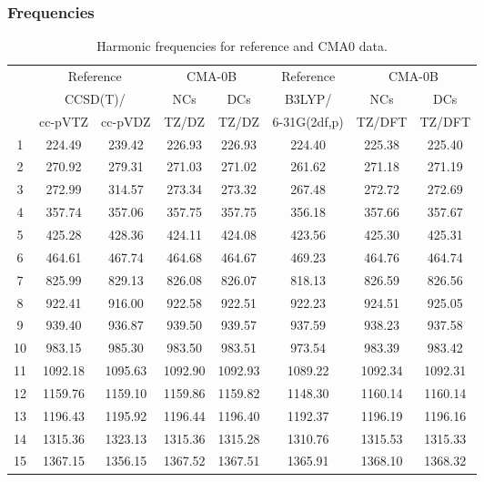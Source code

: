 \documentclass[10pt,oneside]{article}
\begin{document}
\clearpage

\subsubsection*{Frequencies}
\begin{table}[h!]
\centering
\caption{Harmonic frequencies for reference and CMA0 data.}
\begin{tabular}{cccccccc}
\toprule
{} & \multicolumn{2}{c}{Reference} & \multicolumn{2}{c}{CMA-0B} &    Reference & \multicolumn{2}{c}{CMA-0B} \\
{} & \multicolumn{2}{c}{CCSD(T)/} &     NCs &     DCs &       B3LYP/ &     NCs &     DCs \\
{} &   cc-pVTZ & cc-pVDZ &   TZ/DZ &   TZ/DZ & 6-31G(2df,p) &  TZ/DFT &  TZ/DFT \\
\midrule
1  &    224.49 &  239.42 &  226.93 &  226.93 &       224.40 &  225.38 &  225.40 \\
2  &    270.92 &  279.31 &  271.03 &  271.02 &       261.62 &  271.18 &  271.19 \\
3  &    272.99 &  314.57 &  273.34 &  273.32 &       267.48 &  272.72 &  272.69 \\
4  &    357.74 &  357.06 &  357.75 &  357.75 &       356.18 &  357.66 &  357.67 \\
5  &    425.28 &  428.36 &  424.11 &  424.08 &       423.56 &  425.30 &  425.31 \\
6  &    464.61 &  467.74 &  464.68 &  464.67 &       469.23 &  464.76 &  464.74 \\
7  &    825.99 &  829.13 &  826.08 &  826.07 &       818.13 &  826.59 &  826.56 \\
8  &    922.41 &  916.00 &  922.58 &  922.51 &       922.23 &  924.51 &  925.05 \\
9  &    939.40 &  936.87 &  939.50 &  939.57 &       937.59 &  938.23 &  937.58 \\
10 &    983.15 &  985.30 &  983.50 &  983.51 &       973.54 &  983.39 &  983.42 \\
11 &   1092.18 & 1095.63 & 1092.90 & 1092.93 &      1089.22 & 1092.34 & 1092.31 \\
12 &   1159.76 & 1159.10 & 1159.86 & 1159.82 &      1148.30 & 1160.14 & 1160.14 \\
13 &   1196.43 & 1195.92 & 1196.44 & 1196.40 &      1192.37 & 1196.19 & 1196.16 \\
14 &   1315.36 & 1323.13 & 1315.36 & 1315.28 &      1310.76 & 1315.53 & 1315.33 \\
15 &   1367.15 & 1356.15 & 1367.52 & 1367.51 &      1365.91 & 1368.10 & 1368.32 \\

\end{tabular}
\end{table}
\end{document}
